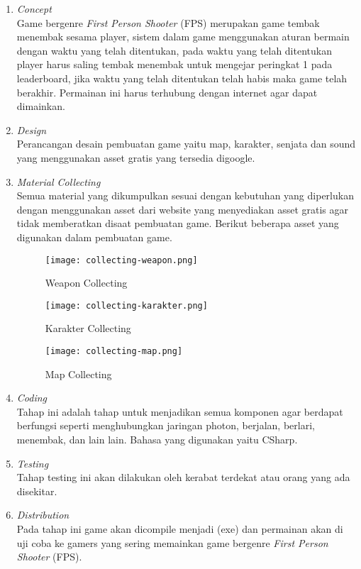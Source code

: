 \begin{enumerate}
    \item \textit{Concept} \\
    Game bergenre \textit{First Person Shooter} (FPS) merupakan game tembak menembak sesama player, sistem dalam game menggunakan aturan bermain dengan waktu yang telah ditentukan, pada waktu yang telah ditentukan player harus saling tembak menembak untuk mengejar peringkat 1 pada leaderboard, jika waktu yang telah ditentukan telah habis maka game telah berakhir. Permainan ini harus terhubung dengan internet agar dapat dimainkan.
    \item \textit{Design} \\
    Perancangan desain pembuatan game yaitu map, karakter, senjata dan sound yang menggunakan asset gratis yang tersedia digoogle.
    \item \textit{Material Collecting} \\
    Semua material yang dikumpulkan sesuai dengan kebutuhan yang diperlukan dengan menggunakan asset dari website yang menyediakan asset gratis agar tidak memberatkan disaat pembuatan game. Berikut beberapa asset yang digunakan dalam pembuatan game.
    \begin{figure}[h]
        \centering
        \texttt{[image: collecting-weapon.png]}
        \caption{Weapon Collecting}
        \label{fig:weapon-collecting}
    \end{figure}
    \begin{figure}[h]
        \centering
        \texttt{[image: collecting-karakter.png]}
        \caption{Karakter Collecting}
        \label{fig:karakter-collecting}
    \end{figure}
    \begin{figure}[h]
        \centering
        \texttt{[image: collecting-map.png]}
        \caption{Map Collecting}
        \label{fig:map-collecting}
    \end{figure}
    \newpage
    \item \textit{Coding} \\
    Tahap ini adalah tahap untuk menjadikan semua komponen agar berdapat berfungsi seperti menghubungkan jaringan photon, berjalan, berlari, menembak, dan lain lain. Bahasa yang digunakan yaitu CSharp.
    \item \textit{Testing} \\
    Tahap testing ini akan dilakukan oleh kerabat terdekat atau orang yang ada disekitar.
    \item \textit{Distribution} \\
    Pada tahap ini game akan dicompile menjadi (exe) dan permainan akan di uji coba ke gamers yang sering memainkan game bergenre \textit{First Person Shooter} (FPS).
\end{enumerate}
